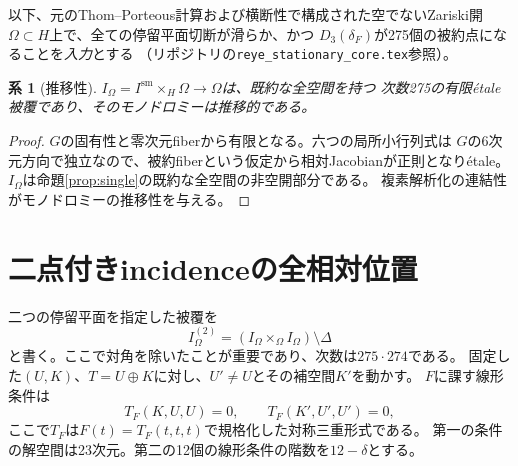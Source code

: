 \documentclass[11pt,a4paper]{ltjsarticle}
\newtheorem{corollary}[theorem]{系}
\begin{document}
以下、元のThom--Porteous計算および横断性で構成された空でないZariski開
$\Omega\subset H$上で、全ての停留平面切断が滑らか、かつ
$D_3(\delta_F)$が275個の被約点になることを\emph{入力}とする
（リポジトリの\texttt{reye\_stationary\_core.tex}参照）。

\begin{corollary}[推移性]\label{cor:trans}
$I_\Omega=I^{\mathrm{sm}}\times_H\Omega\to\Omega$は、既約な全空間を持つ
次数275の有限étale被覆であり、そのモノドロミーは推移的である。
\end{corollary}
\begin{proof}
$G$の固有性と零次元fiberから有限となる。六つの局所小行列式は
$G$の6次元方向で独立なので、被約fiberという仮定から相対Jacobianが正則となりétale。
$I_\Omega$は命題\ref{prop:single}の既約な全空間の非空開部分である。
複素解析化の連結性がモノドロミーの推移性を与える。
\end{proof}

\section{二点付きincidenceの全相対位置}\label{sec:two}
二つの停留平面を指定した被覆を
\[
 I^{(2)}_\Omega=(I_\Omega\times_\Omega I_\Omega)\setminus\Delta
\]
と書く。ここで対角を除いたことが重要であり、次数は$275\cdot274$である。
固定した$(U,K)$、$T=U\oplus K$に対し、$U'\ne U$とその補空間$K'$を動かす。
$F$に課す線形条件は
\begin{equation}\label{eq:twocond}
 T_F(K,U,U)=0,\qquad T_F(K',U',U')=0,
\end{equation}
ここで$T_F$は$F(t)=T_F(t,t,t)$で規格化した対称三重形式である。
第一の条件の解空間は23次元。第二の12個の線形条件の階数を$12-\delta$とする。
\end{document}
